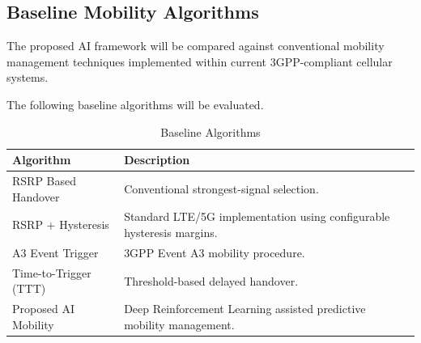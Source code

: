 \documentclass[12pt,a4paper]{article}\usepackage[a4paper,margin=1in]{geometry}\usepackage{graphicx}\usepackage{longtable}\usepackage{booktabs}\usepackage{hyperref}\usepackage{enumitem}\usepackage{amsmath}\usepackage{tikz}\usepackage{pgfgantt}\usepackage{setspace}\setstretch{1.15}\usetikzlibrary{positioning,arrows.meta,shapes.geometric}
\begin{document}
	
	\subsection{Baseline Mobility Algorithms}
	
	The proposed AI framework will be compared against conventional mobility management techniques implemented within current 3GPP-compliant cellular systems.
	
	The following baseline algorithms will be evaluated.
	
	\begin{table}[h]
		
		\centering
		
		\caption{Baseline Algorithms}
		
		\begin{tabular}{p{5cm}p{9cm}}
			
			\toprule
			
			Algorithm
			
			&
			
			Description
			
			\\
			
			\midrule
			
			RSRP Based Handover
			
			&
			
			Conventional strongest-signal selection.
			
			\\
			
			RSRP + Hysteresis
			
			&
			
			Standard LTE/5G implementation using configurable hysteresis margins.
			
			\\
			
			A3 Event Trigger
			
			&
			
			3GPP Event A3 mobility procedure.
			
			\\
			
			Time-to-Trigger (TTT)
			
			&
			
			Threshold-based delayed handover.
			
			\\
			
			Proposed AI Mobility
			
			&
			
			Deep Reinforcement Learning assisted predictive mobility management.
			
			\\
			
			\bottomrule
			
		\end{tabular}
		
	\end{table}
	
\end{document}

